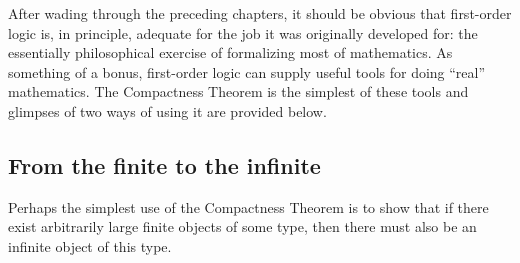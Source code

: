 \documentclass[12pt]{amsbook}
\theoremstyle{plain}
\theoremstyle{definition}
\theoremstyle{remark}
\begin{document}
After wading through the preceding chapters,  it should be obvious that first-order logic is,  in principle,  adequate for the job it was originally developed for:  the essentially philosophical exercise of formalizing most of mathematics.  As something of a bonus,  first-order logic can supply useful tools for doing ``real'' mathematics.  The Compactness Theorem is the simplest of these tools and glimpses of two ways of using it are provided below.


\subsection*{From the finite to the infinite}

Perhaps the simplest use of the Compactness Theorem is to show that if there exist arbitrarily large finite objects of some type,  then there must also be an infinite object of this type.  
\end{document}
